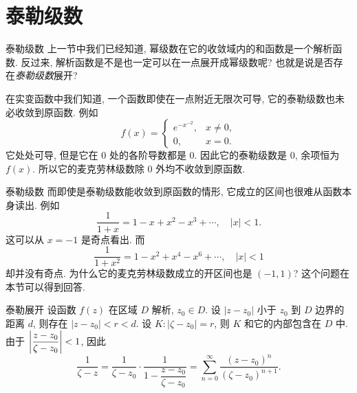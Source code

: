 \section{泰勒级数}


\begin{frame}{泰勒级数}
\onslide<+->
上一节中我们已经知道, 幂级数在它的收敛域内的和函数是一个解析函数.
\onslide<+->
反过来, 解析函数是不是也一定可以在一点展开成幂级数呢? 也就是说是否存在\emph{泰勒级数}展开?

\onslide<+->
在实变函数中我们知道, 一个函数即使在一点附近无限次可导, 它的泰勒级数也未必收敛到原函数.
\onslide<+->
例如
\[f(x)=\begin{cases}
e^{-x^{-2}},&x\neq 0,\\
0,&x=0.\end{cases}\]
\onslide<+->
它处处可导, 但是它在 $0$ 处的各阶导数都是 $0$.
\onslide<+->
因此它的泰勒级数是 $0$, 余项恒为 $f(x)$.
\onslide<+->
所以它的麦克劳林级数除 $0$ 外均不收敛到原函数.
\end{frame}


\begin{frame}{泰勒级数}
\onslide<+->
而即使是泰勒级数能收敛到原函数的情形, 它成立的区间也很难从函数本身读出.
\onslide<+->
例如
\[\dfrac1{1+x}=1-x+x^2-x^3+\cdots,\quad|x|<1.\]
\onslide<+->
这可以从 $x=-1$ 是奇点看出.
\onslide<+->
而
\[\dfrac1{1+x^2}=1-x^2+x^4-x^6+\cdots,\quad|x|<1\]
却并没有奇点.
\onslide<+->
为什么它的麦克劳林级数成立的开区间也是 $(-1,1)$?
\onslide<+->
这个问题在本节可以得到回答.
\end{frame}


\begin{frame}{泰勒展开}
\onslide<+->
设函数 $f(z)$ 在区域 $D$ 解析, $z_0\in D$.
\onslide<+->
设 $|z-z_0|$ 小于 $z_0$ 到 $D$ 边界的距离 $d$,
则存在 $|z-z_0|<r<d$.
\onslide<+->
设 $K:|\zeta-z_0|=r$, 则 $K$ 和它的内部包含在 $D$ 中.
\onslide<+->
由于 $\left|\dfrac{z-z_0}{\zeta-z_0}\right|<1$, 因此
\[\frac1{\zeta-z}=\frac1{\zeta-z_0}\cdot\frac1{1-\dfrac{z-z_0}{\zeta-z_0}}=\sum_{n=0}^\infty\frac{(z-z_0)^n}{(\zeta-z_0)^{n+1}}.\]

\begin{center}
\end{center}
\end{frame}


